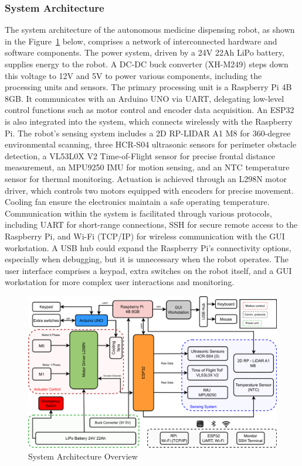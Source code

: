 \subsubsection{System Architecture}
The system architecture of the autonomous medicine dispensing robot, as shown in the Figure~\ref{system} below, comprises
a network of interconnected hardware and software components. The power system, driven by a 24V 22Ah LiPo battery, supplies
energy to the robot. A DC-DC buck converter (XH-M249) steps down this voltage to 12V and 5V to power various components, including the processing
units and sensors. The primary processing unit is a Raspberry Pi 4B 8GB. It communicates with an Arduino UNO 
via UART, delegating low-level control functions such as motor control and encoder data acquisition. An ESP32
is also integrated into the system, which connects wirelessly
with the Raspberry Pi.
The robot's sensing system includes a 2D RP-LIDAR A1 M8 for 360-degree environmental scanning, three HCR-S04 ultrasonic sensors
for perimeter obstacle detection, a VL53L0X V2 Time-of-Flight sensor for precise frontal distance measurement, an MPU9250 IMU 
for motion sensing, and an NTC temperature sensor for thermal monitoring. Actuation is achieved through an L298N motor driver,
which controls two motors equipped with encoders for precise movement. Cooling fan ensure the electronics maintain a safe operating temperature.
Communication within the system is facilitated through various protocols, including UART for short-range connections, SSH
for secure remote access to the Raspberry Pi, and Wi-Fi (TCP/IP) for wireless
communication with the GUI workstation. A USB hub could expand the Raspberry Pi's connectivity options, especially when debugging,
but it is unnecessary when the robot operates. The user interface comprises a keypad, extra switches on the robot itself, and
a GUI workstation for more complex user interactions and monitoring. 

\vspace{0.15in}

\begin{figure}[H]
    \centering
    \includegraphics[width=6.1in]{pics/Hardware_Architecture3.png}
    \caption{System Architecture Overview}\label{system}
\end{figure} 


